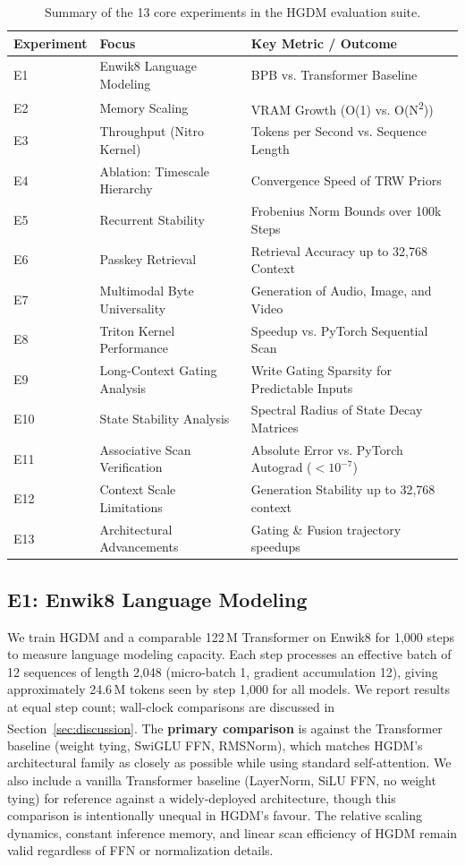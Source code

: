 \documentclass{article}
\begin{document}
\begin{table}[!ht]
\centering
\caption{Summary of the 13 core experiments in the HGDM evaluation suite.}
\label{tab:experiments_summary}
\begin{tabular}{lll}
\toprule
Experiment & Focus & Key Metric / Outcome \\
\midrule
E1 & Enwik8 Language Modeling & BPB vs. Transformer Baseline \\
E2 & Memory Scaling & VRAM Growth (O(1) vs. O(N\textsuperscript{2})) \\
E3 & Throughput (Nitro Kernel) & Tokens per Second vs. Sequence Length \\
E4 & Ablation: Timescale Hierarchy & Convergence Speed of TRW Priors \\
E5 & Recurrent Stability & Frobenius Norm Bounds over 100k Steps \\
E6 & Passkey Retrieval & Retrieval Accuracy up to 32,768 Context \\
E7 & Multimodal Byte Universality & Generation of Audio, Image, and Video \\
E8 & Triton Kernel Performance & Speedup vs. PyTorch Sequential Scan \\
E9 & Long-Context Gating Analysis & Write Gating Sparsity for Predictable Inputs \\
E10 & State Stability Analysis & Spectral Radius of State Decay Matrices \\
E11 & Associative Scan Verification & Absolute Error vs. PyTorch Autograd ($< 10^{-7}$) \\
E12 & Context Scale Limitations & Generation Stability up to 32,768 context \\
E13 & Architectural Advancements & Gating \& Fusion trajectory speedups \\
\bottomrule
\end{tabular}
\end{table}

\subsection{E1: Enwik8 Language Modeling}
We train HGDM and a comparable 122\,M Transformer on Enwik8 for 1{,}000 steps to measure language modeling capacity. Each step processes an effective batch of 12 sequences of length 2{,}048 (micro-batch 1, gradient accumulation 12), giving approximately 24.6\,M tokens seen by step 1{,}000 for all models. We report results at equal step count; wall-clock comparisons are discussed in Section~\ref{sec:discussion}. The \textbf{primary comparison} is against the Transformer\textsuperscript{\textdagger} baseline (weight tying, SwiGLU FFN, RMSNorm), which matches HGDM's architectural family as closely as possible while using standard self-attention. We also include a vanilla Transformer baseline (LayerNorm, SiLU FFN, no weight tying) for reference against a widely-deployed architecture, though this comparison is intentionally unequal in HGDM's favour. The relative scaling dynamics, constant inference memory, and linear scan efficiency of HGDM remain valid regardless of FFN or normalization details.
\end{document}
